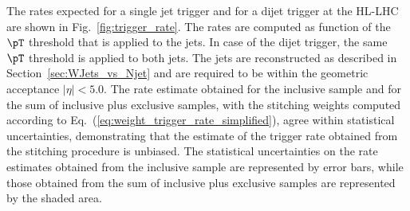 The rates expected for a single jet trigger and for a dijet trigger at the HL-LHC are shown in Fig.~\ref{fig:trigger_rate}.
The rates are computed as function of the $\pT$ threshold that is applied to the jets. 
In case of the dijet trigger, the same $\pT$ threshold is applied to both jets.
The jets are reconstructed as described in Section~\ref{sec:WJets_vs_Njet}
and are required to be within the geometric acceptance $\vert\eta\vert < 5.0$.
The rate estimate obtained for the inclusive sample and for the sum of inclusive plus exclusive samples, 
with the stitching weights computed according to Eq.~(\ref{eq:weight_trigger_rate_simplified}),
agree within statistical uncertainties, demonstrating that the estimate of the trigger rate obtained from the stitching procedure is unbiased.
The statistical uncertainties on the rate estimates obtained from the inclusive sample are represented by error bars,
while those obtained from the sum of inclusive plus exclusive samples are represented by the shaded area.

